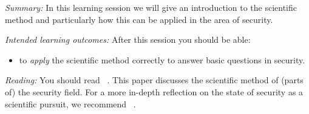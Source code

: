 \mode*


\emph{Summary:}
In this learning session we will give an introduction to the scientific method 
and particularly how this can be applied in the area of security.

\emph{Intended learning outcomes:}
After this session you should be able:
\begin{itemize}
  \item to \emph{apply} the scientific method correctly to answer basic 
    questions in security.
\end{itemize}


\emph{Reading:}
You should read 
~\cite{HowToDesignSecurityExperiments}.
This paper discusses the scientific method of (parts of) the security field.
For a more in-depth reflection on the state of security as a scientific pursuit, 
we recommend
~\cite{SecurityAsAScience}.

